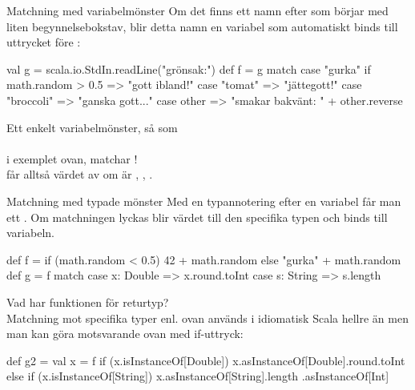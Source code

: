\begin{Slide}{Matchning med variabelmönster}\SlideFontSmall
Om det finns ett namn efter  som börjar med liten begynnelsebokstav, blir detta namn en variabel som automatiskt binds till uttrycket före :

\begin{Code}
val g = scala.io.StdIn.readLine("grönsak:")
def f = g match {
  case "gurka" if math.random > 0.5 => "gott ibland!"
  case "tomat" => "jättegott!"
  case "broccoli" => "ganska gott..."
  case other => "smakar bakvänt: " + other.reverse
}
\end{Code}

Ett enkelt variabelmönster, så som \\  \\ i exemplet ovan, matchar ! \\ får alltså värdet av  om   är , , .

\end{Slide}





\begin{Slide}{Matchning med typade mönster}\SlideFontSmall
Med en typannotering efter en variabel får man ett  . Om matchningen lyckas blir värdet  till den specifika typen och binds till variabeln.
\begin{Code}
def f = if (math.random < 0.5) 42 + math.random else "gurka" + math.random
def g = f match {
  case x: Double => x.round.toInt
  case s: String => s.length
}
\end{Code}
Vad har funktionen  för returtyp? \\ \pause
Matchning mot specifika typer enl. ovan används i idiomatisk Scala hellre än  men man kan göra motsvarande ovan med if-uttryck:
\begin{Code}
def g2 = {
  val x = f
  if (x.isInstanceOf[Double]) x.asInstanceOf[Double].round.toInt
  else if (x.isInstanceOf[String]) x.asInstanceOf[String].length
}.asInstanceOf[Int]
\end{Code}
\end{Slide}



